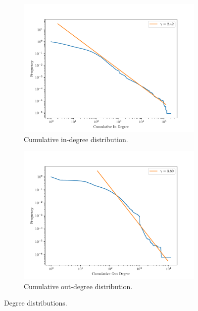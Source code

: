 \documentclass[9pt,a4paper,twocolumn]{article}
\begin{document}
\begin{figure}[h]
	\centering
	\begin{subfigure}{.45\textwidth}
		\centering
		\includegraphics[width=\linewidth]{wikipedia_pt_in.pdf}
		\caption{Cumulative in-degree distribution.}
		\label{fig:inddist}
	\end{subfigure}
	\begin{subfigure}{.45\textwidth}
		\centering
		\includegraphics[width=\linewidth]{wikipedia_pt_out.pdf}
		\caption{Cumulative out-degree distribution.}
		\label{fig:outddist}
	\end{subfigure}
	\caption{Degree distributions.}
\end{figure}
\end{document}
